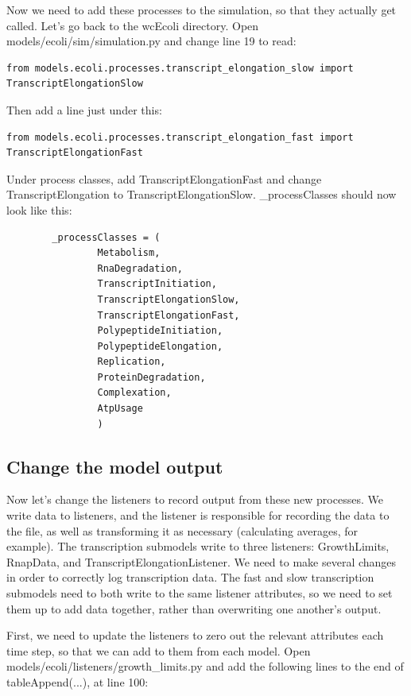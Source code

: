 \documentclass[12pt]{article}
\begin{document}
Now we need to add these processes to the simulation, so that they actually get called. Let’s go back to the wcEcoli directory. Open models/ecoli/sim/simulation.py and change line 19 to read: 

\lstset{language=Python}
\begin{lstlisting}
from models.ecoli.processes.transcript_elongation_slow import TranscriptElongationSlow
\end{lstlisting}

Then add a line just under this:

\begin{lstlisting}
from models.ecoli.processes.transcript_elongation_fast import TranscriptElongationFast
\end{lstlisting}

Under process classes, add TranscriptElongationFast and change TranscriptElongation to TranscriptElongationSlow. \_processClasses should now look like this:


\begin{lstlisting}
        _processClasses = (
                Metabolism,
                RnaDegradation,
                TranscriptInitiation,
                TranscriptElongationSlow,
                TranscriptElongationFast,
                PolypeptideInitiation,
                PolypeptideElongation,
                Replication,
                ProteinDegradation,
                Complexation,
                AtpUsage
                )
\end{lstlisting}

\subsection{Change the model output}

Now let’s change the listeners to record output from these new processes. We write data to listeners, and the listener is responsible for recording the data to the file, as well as transforming it as necessary (calculating averages, for example). The transcription submodels write to three listeners: GrowthLimits, RnapData, and TranscriptElongationListener. We need to make several changes in order to correctly log transcription data. The fast and slow transcription submodels need to both write to the same listener attributes, so we need to set them up to add data together, rather than overwriting one another's output.

First, we need to update the listeners to zero out the relevant attributes each time step, so that we can add to them from each model. Open models/ecoli/listeners/growth_limits.py and add the following lines to the end of tableAppend(...), at line 100:
\end{document}
